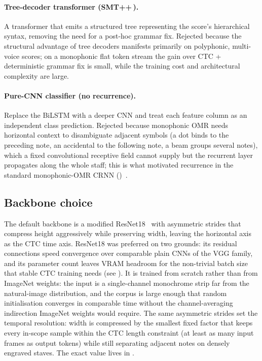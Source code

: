 \paragraph{Tree-decoder transformer (SMT++\,\cite{riosVilaSMTPlusPlus2024}).}
A transformer that emits a structured tree representing the score's
hierarchical syntax, removing the need for a post-hoc grammar fix.
Rejected because the structural advantage of tree decoders manifests
primarily on polyphonic, multi-voice scores; on a monophonic flat
token stream the gain over CTC + deterministic grammar fix is small,
while the training cost and architectural complexity are large.

\paragraph{Pure-CNN classifier (no recurrence).}
Replace the BiLSTM with a deeper CNN and treat each feature column as
an independent class prediction.
Rejected because monophonic OMR needs horizontal context to
disambiguate adjacent symbols (a dot binds to the preceding note,
an accidental to the following note, a beam groups several notes),
which a fixed convolutional receptive field cannot supply but the
recurrent layer propagates along the whole staff; this is what
motivated recurrence in the standard monophonic-OMR CRNN
()~\cite{calvoZaragozaEndToEndNeural2018}.

\subsection{Backbone choice}

The default backbone is a modified
ResNet18~\cite{heDeepResidualLearning2016} with asymmetric strides
that compress height aggressively while preserving width, leaving the
horizontal axis as the CTC time axis. ResNet18 was preferred on two
grounds: its residual connections speed convergence over comparable
plain CNNs of the VGG family, and its parameter count leaves VRAM
headroom for the non-trivial batch size that stable CTC training needs
(see ). It is trained from scratch rather than from
ImageNet weights: the input is a single-channel monochrome strip far
from the natural-image distribution, and the corpus is large enough
that random initialisation converges in comparable time without the
channel-averaging indirection ImageNet weights would require.
The same asymmetric strides set the temporal resolution: width is
compressed by the smallest fixed factor that keeps every in-scope
sample within the CTC length constraint (at least as many input frames
as output tokens) while still separating adjacent notes on densely
engraved staves. The exact value lives in .

